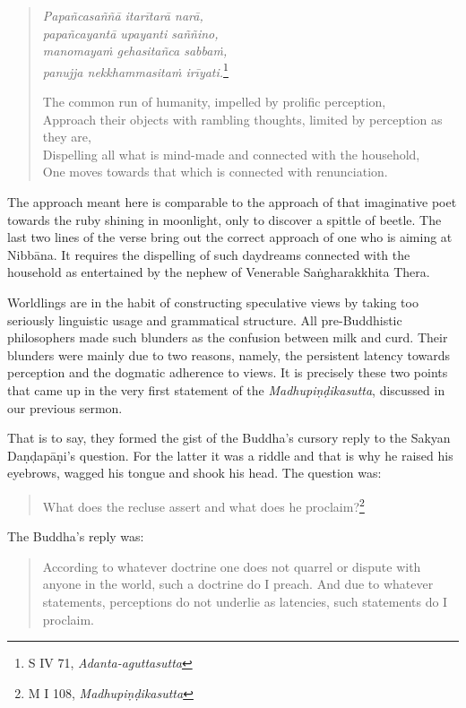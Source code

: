 \clearpage

\begin{quote}
\emph{Papañcasaññā itarītarā narā,}\\
\emph{papañcayantā upayanti saññino,}\\
\emph{manomayaṁ gehasitañca sabbaṁ,}\\
\emph{panujja nekkhammasitaṁ irīyati.}\footnote{S IV 71, \emph{Adanta-aguttasutta}}

The common run of humanity, impelled by prolific perception,\\
Approach their objects with rambling thoughts, limited by perception as they are,\\
Dispelling all what is mind-made and connected with the household,\\
One moves towards that which is connected with renunciation.
\end{quote}

The approach meant here is comparable to the approach of that imaginative poet towards the ruby shining in moonlight, only to discover a spittle of beetle. The last two lines of the verse bring out the correct approach of one who is aiming at Nibbāna. It requires the dispelling of such daydreams connected with the household as entertained by the nephew of Venerable Saṅgharakkhita Thera.

Worldlings are in the habit of constructing speculative views by taking too seriously linguistic usage and grammatical structure. All pre-Buddhistic philosophers made such blunders as the confusion between milk and curd. Their blunders were mainly due to two reasons, namely, the persistent latency towards perception and the dogmatic adherence to views. It is precisely these two points that came up in the very first statement of the \emph{Madhupiṇḍikasutta}, discussed in our previous sermon.

That is to say, they formed the gist of the Buddha's cursory reply to the Sakyan Daṇḍapāṇi's question. For the latter it was a riddle and that is why he raised his eyebrows, wagged his tongue and shook his head. The question was:

\begin{quote}
What does the recluse assert and what does he proclaim?\footnote{M I 108, \emph{Madhupiṇḍikasutta}}
\end{quote}

The Buddha's reply was:

\begin{quote}
According to whatever doctrine one does not quarrel or dispute with anyone in the world, such a doctrine do I preach. And due to whatever statements, perceptions do not underlie as latencies, such statements do I proclaim.
\end{quote}

